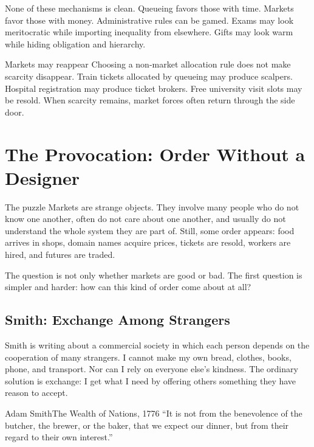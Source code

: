 \documentclass[10pt,a4paper]{article}
\begin{document}
None of these mechanisms is clean. Queueing favors those with time. Markets favor those with money. Administrative rules can be gamed. Exams may look meritocratic while importing inequality from elsewhere. Gifts may look warm while hiding obligation and hierarchy.

\begin{insightbox}{Markets may reappear}
Choosing a non-market allocation rule does not make scarcity disappear. Train tickets allocated by queueing may produce scalpers. Hospital registration may produce ticket brokers. Free university visit slots may be resold. When scarcity remains, market forces often return through the side door.
\end{insightbox}

\section{The Provocation: Order Without a Designer}

\begin{keybox}{The puzzle}
Markets are strange objects. They involve many people who do not know one another, often do not care about one another, and usually do not understand the whole system they are part of. Still, some order appears: food arrives in shops, domain names acquire prices, tickets are resold, workers are hired, and futures are traded.

The question is not only whether markets are good or bad. The first question is simpler and harder: how can this kind of order come about at all?
\end{keybox}

\subsection{Smith: Exchange Among Strangers}

Smith is writing about a commercial society in which each person depends on the cooperation of many strangers. I cannot make my own bread, clothes, books, phone, and transport. Nor can I rely on everyone else's kindness. The ordinary solution is exchange: I get what I need by offering others something they have reason to accept.

\begin{quotebox}{Adam Smith}{The Wealth of Nations, 1776}
``It is not from the benevolence of the butcher, the brewer, or the baker, that we expect our dinner, but from their regard to their own interest.''
\end{quotebox}
\end{document}
